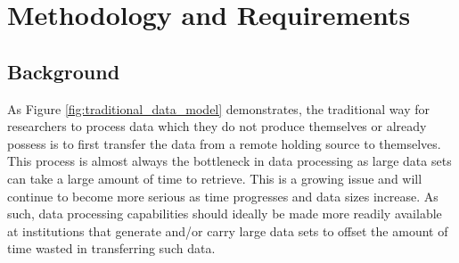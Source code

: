 
\chapter{Methodology and Requirements} %

\label{Chapter2} %




\section{Background}

As Figure \ref{fig:traditional_data_model} demonstrates, the traditional way for researchers to process data which they do not produce themselves or already possess is to first transfer the data from a remote holding source to themselves. This process is almost always the bottleneck in data processing as large data sets can take a large amount of time to retrieve. This is a growing issue and will continue to become more serious as time progresses and data sizes increase. As such, data processing capabilities should ideally be made more readily available at institutions that generate and/or carry large data sets to offset the amount of time wasted in transferring such data.

